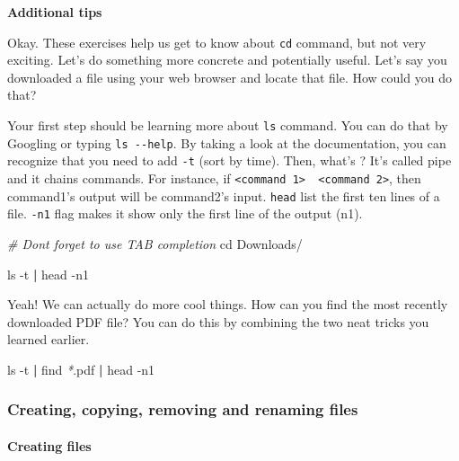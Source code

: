 \documentclass[
]{book}
\newenvironment{Shaded}{\begin{snugshade}}{\end{snugshade}}
\newcommand{\AttributeTok}[1]{\textcolor[rgb]{0.77,0.63,0.00}{#1}}
\newcommand{\BuiltInTok}[1]{#1}
\newcommand{\CommentTok}[1]{\textcolor[rgb]{0.56,0.35,0.01}{\textit{#1}}}
\newcommand{\FunctionTok}[1]{\textcolor[rgb]{0.00,0.00,0.00}{#1}}
\newcommand{\KeywordTok}[1]{\textcolor[rgb]{0.13,0.29,0.53}{\textbf{#1}}}
\newcommand{\NormalTok}[1]{#1}
\newcommand{\PreprocessorTok}[1]{\textcolor[rgb]{0.56,0.35,0.01}{\textit{#1}}}
\begin{document}
\textbf{Additional tips}

Okay. These exercises help us get to know about \texttt{cd} command, but not very exciting. Let's do something more concrete and potentially useful. Let's say you downloaded a file using your web browser and locate that file. How could you do that?

Your first step should be learning more about \texttt{ls} command. You can do that by Googling or typing \texttt{ls\ -\/-help}. By taking a look at the documentation, you can recognize that you need to add \texttt{-t} (sort by time). Then, what's \texttt{\textbar{}}? It's called pipe and it chains commands. For instance, if \texttt{\textless{}command\ 1\textgreater{}\ \textbar{}\ \textless{}command\ 2\textgreater{}}, then command1's output will be command2's input. \texttt{head} list the first ten lines of a file. \texttt{-n1} flag makes it show only the first line of the output (n1).

\begin{Shaded}
\begin{Highlighting}[]
\CommentTok{\# Don\textquotesingle{}t forget to use TAB completion}
\BuiltInTok{cd}\NormalTok{ Downloads/ }

\FunctionTok{ls} \AttributeTok{{-}t} \KeywordTok{|} \FunctionTok{head} \AttributeTok{{-}n1}
\end{Highlighting}
\end{Shaded}

Yeah! We can actually do more cool things. How can you find the most recently downloaded PDF file? You can do this by combining the two neat tricks you learned earlier.

\begin{Shaded}
\begin{Highlighting}[]
\FunctionTok{ls} \AttributeTok{{-}t} \KeywordTok{|} \FunctionTok{find} \PreprocessorTok{*}\NormalTok{.pdf }\KeywordTok{|} \FunctionTok{head} \AttributeTok{{-}n1} 
\end{Highlighting}
\end{Shaded}

\hypertarget{creating-copying-removing-and-renaming-files}{%
\subsubsection{Creating, copying, removing and renaming files}\label{creating-copying-removing-and-renaming-files}}

\hypertarget{creating-files}{%
\paragraph{Creating files}\label{creating-files}}
\end{document}
